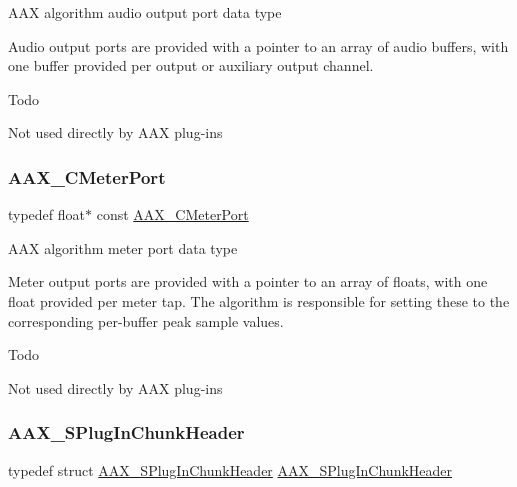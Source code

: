 A\+AX algorithm audio output port data type 

Audio output ports are provided with a pointer to an array of audio buffers, with one buffer provided per output or auxiliary output channel.

\begin{DoxyRefDesc}{Todo}
\item[\mbox{\hyperlink{a00785__todo000010}{Todo}}]Not used directly by A\+AX plug-\/ins \end{DoxyRefDesc}
\mbox{\label{a00392_aa6f40c5c3f36ede060fca61535ea8464}} 
\subsubsection{\texorpdfstring{AAX\_CMeterPort}{AAX\_CMeterPort}}
{\footnotesize\ttfamily typedef float$\ast$ const \mbox{\hyperlink{a00392_aa6f40c5c3f36ede060fca61535ea8464}{A\+A\+X\+\_\+\+C\+Meter\+Port}}}



A\+AX algorithm meter port data type 

Meter output ports are provided with a pointer to an array of floats, with one float provided per meter tap. The algorithm is responsible for setting these to the corresponding per-\/buffer peak sample values.

\begin{DoxyRefDesc}{Todo}
\item[\mbox{\hyperlink{a00785__todo000011}{Todo}}]Not used directly by A\+AX plug-\/ins \end{DoxyRefDesc}
\mbox{\label{a00392_a5a7e5322afe0c3b98da933557ae0cbba}} 
\subsubsection{\texorpdfstring{AAX\_SPlugInChunkHeader}{AAX\_SPlugInChunkHeader}}
{\footnotesize\ttfamily typedef struct \mbox{\hyperlink{a01417}{A\+A\+X\+\_\+\+S\+Plug\+In\+Chunk\+Header}} \mbox{\hyperlink{a01417}{A\+A\+X\+\_\+\+S\+Plug\+In\+Chunk\+Header}}}

\mbox{\label{a00392_af52a5fe2ae79f803234d089889b7e481}} 

